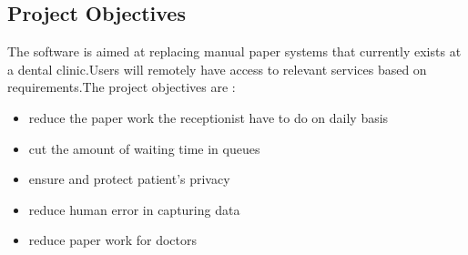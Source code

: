 \documentclass[12pt]{article}
\begin{document}
\subsection{Project Objectives }
The software is aimed at replacing manual paper systems that currently exists at a dental clinic.Users will remotely have access to relevant services based on requirements.The project objectives are :
\begin{itemize}
\item reduce the paper work the receptionist have to do on daily basis
\item cut the amount of waiting time in queues
\item ensure and protect patient's privacy
\item reduce human error in capturing data
\item reduce paper work for doctors
\end{itemize}
\end{document}
